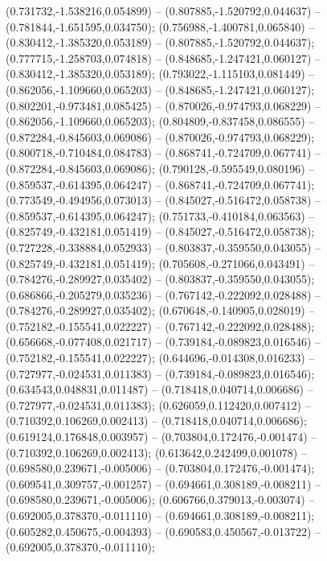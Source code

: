  (0.731732,-1.538216,0.054899) -- (0.807885,-1.520792,0.044637) -- (0.781844,-1.651595,0.034750);
 (0.756988,-1.400781,0.065840) -- (0.830412,-1.385320,0.053189) -- (0.807885,-1.520792,0.044637);
 (0.777715,-1.258703,0.074818) -- (0.848685,-1.247421,0.060127) -- (0.830412,-1.385320,0.053189);
 (0.793022,-1.115103,0.081449) -- (0.862056,-1.109660,0.065203) -- (0.848685,-1.247421,0.060127);
 (0.802201,-0.973481,0.085425) -- (0.870026,-0.974793,0.068229) -- (0.862056,-1.109660,0.065203);
 (0.804809,-0.837458,0.086555) -- (0.872284,-0.845603,0.069086) -- (0.870026,-0.974793,0.068229);
 (0.800718,-0.710484,0.084783) -- (0.868741,-0.724709,0.067741) -- (0.872284,-0.845603,0.069086);
 (0.790128,-0.595549,0.080196) -- (0.859537,-0.614395,0.064247) -- (0.868741,-0.724709,0.067741);
 (0.773549,-0.494956,0.073013) -- (0.845027,-0.516472,0.058738) -- (0.859537,-0.614395,0.064247);
 (0.751733,-0.410184,0.063563) -- (0.825749,-0.432181,0.051419) -- (0.845027,-0.516472,0.058738);
 (0.727228,-0.338884,0.052933) -- (0.803837,-0.359550,0.043055) -- (0.825749,-0.432181,0.051419);
 (0.705608,-0.271066,0.043491) -- (0.784276,-0.289927,0.035402) -- (0.803837,-0.359550,0.043055);
 (0.686866,-0.205279,0.035236) -- (0.767142,-0.222092,0.028488) -- (0.784276,-0.289927,0.035402);
 (0.670648,-0.140905,0.028019) -- (0.752182,-0.155541,0.022227) -- (0.767142,-0.222092,0.028488);
 (0.656668,-0.077408,0.021717) -- (0.739184,-0.089823,0.016546) -- (0.752182,-0.155541,0.022227);
 (0.644696,-0.014308,0.016233) -- (0.727977,-0.024531,0.011383) -- (0.739184,-0.089823,0.016546);
 (0.634543,0.048831,0.011487) -- (0.718418,0.040714,0.006686) -- (0.727977,-0.024531,0.011383);
 (0.626059,0.112420,0.007412) -- (0.710392,0.106269,0.002413) -- (0.718418,0.040714,0.006686);
 (0.619124,0.176848,0.003957) -- (0.703804,0.172476,-0.001474) -- (0.710392,0.106269,0.002413);
 (0.613642,0.242499,0.001078) -- (0.698580,0.239671,-0.005006) -- (0.703804,0.172476,-0.001474);
 (0.609541,0.309757,-0.001257) -- (0.694661,0.308189,-0.008211) -- (0.698580,0.239671,-0.005006);
 (0.606766,0.379013,-0.003074) -- (0.692005,0.378370,-0.011110) -- (0.694661,0.308189,-0.008211);
 (0.605282,0.450675,-0.004393) -- (0.690583,0.450567,-0.013722) -- (0.692005,0.378370,-0.011110);
